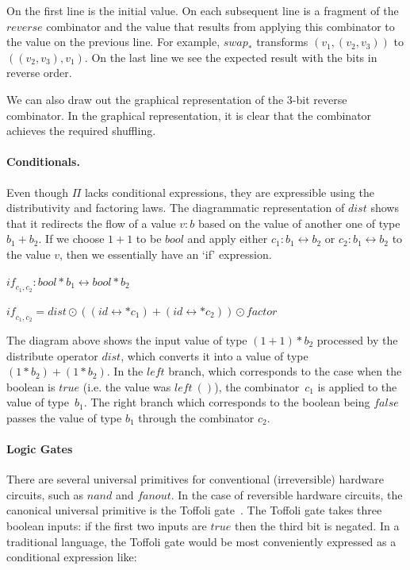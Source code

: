 \documentclass{article}
\newcommand{\inkscape}[2][1.5]{
\begin{center}
\scalebox{#1}{
\texttt{[image: inkscape/\#2]}
}
\end{center}
}
\newcommand{\swapt}{\ensuremath{\mathit{swap}_*}}
\newcommand{\dist}{\ensuremath{\mathit{dist}}}
\newcommand{\factor}{\ensuremath{\mathit{factor}}}
\newcommand{\idc}{\mathit{id}\!\!\leftrightarrow}
\begin{document}
\noindent On the first line is the initial value. On each subsequent
line is a fragment of the \ensuremath{\mathit{reverse}} combinator and the value that
results from applying this combinator to the value on the previous
line. For example, \ensuremath{\swapt} transforms \ensuremath{(v_1, (v_2, v_3))} to
\ensuremath{((v_2,v_3),v_1)}.  On the last line we see the expected result with
the bits in reverse order.

We can also draw out the graphical representation of the 3-bit reverse
combinator. In the graphical representation, it is clear that the
combinator achieves the required shuffling.

\inkscape{reverse-3-bit.pdf}

\paragraph*{Conditionals.}
Even though \ensuremath{\Pi } lacks conditional expressions, they are
expressible using the distributivity and factoring laws. The
diagrammatic representation of \ensuremath{\dist} shows that it redirects the flow
of a value \ensuremath{v:b} based on the value of another one of type
\ensuremath{b_1+b_2}. If we choose \ensuremath{1+1} to be
\ensuremath{\mathit{bool}} and apply either \ensuremath{c_1:b_1\leftrightarrow
b_2} or \ensuremath{c_2:b_1\leftrightarrow b_2} to the value \ensuremath{v},
then we essentially have an `if' expression.

\ensuremath{\mathit{if}_{c_1,c_2} : \mathit{bool}  *  b_1 \leftrightarrow \mathit{bool}  *  b_2}

\ensuremath{\mathit{if}_{c_1,c_2} = \dist \odot ((\idc  *  c_1) + (\idc  *  c_2)) \odot \factor}


\inkscape{if-c1-c2.pdf}


The diagram above shows the input value of type \ensuremath{(1+1) *  b_2}
processed by the distribute operator \ensuremath{\dist}, which converts it into
a value of type \ensuremath{(1 *  b_2)+(1 *  b_2)}. In the
\ensuremath{\mathit{left}} branch, which corresponds to the
case when the boolean is \ensuremath{\mathit{true}} (i.e. the value was
\ensuremath{\mathit{left} ~()}), the combinator~\ensuremath{c_1} is applied to
the value of type~\ensuremath{b_1}. The right
branch which corresponds to the boolean being \ensuremath{\mathit{false}} passes
the value of type \ensuremath{b_1} through the combinator \ensuremath{c_2}.

\paragraph*{Logic Gates}
There are several universal primitives for conventional (irreversible)
hardware circuits, such as \ensuremath{\mathit{nand}} and \ensuremath{\mathit{fanout}}. In the case
of reversible hardware circuits, the canonical universal primitive is
the Toffoli gate~\cite{Toffoli:1980}. The Toffoli gate takes three
boolean inputs: if the first two inputs are \ensuremath{\mathit{true}} then the third
bit is negated. In a traditional language, the Toffoli gate would be
most conveniently expressed as a conditional expression like:
\end{document}
